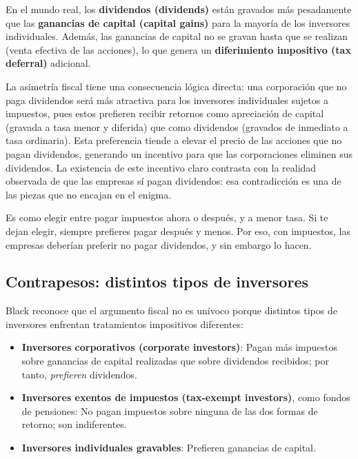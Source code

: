 \documentclass[12pt]{article}
\begin{document}
En el mundo real, los \textbf{dividendos (dividends)} est\'an gravados m\'as pesadamente que las \textbf{ganancias de capital (capital gains)} para la mayor\'ia de los inversores individuales. Adem\'as, las ganancias de capital no se gravan hasta que se realizan (venta efectiva de las acciones), lo que genera un \textbf{diferimiento impositivo (tax deferral)} adicional.

\begin{explicacion}
La asimetr\'ia fiscal tiene una consecuencia l\'ogica directa: una corporaci\'on que no paga dividendos ser\'a m\'as atractiva para los inversores individuales sujetos a impuestos, pues estos prefieren recibir retornos como apreciaci\'on de capital (gravada a tasa menor y diferida) que como dividendos (gravados de inmediato a tasa ordinaria). Esta preferencia tiende a elevar el precio de las acciones que no pagan dividendos, generando un incentivo para que las corporaciones eliminen sus dividendos. La existencia de este incentivo claro contrasta con la realidad observada de que las empresas s\'i pagan dividendos: esa contradicci\'on es una de las piezas que no encajan en el enigma.
\end{explicacion}

\begin{intuicion}
Es como elegir entre pagar impuestos ahora o despu\'es, y a menor tasa. Si te dejan elegir, siempre prefieres pagar despu\'es y menos. Por eso, con impuestos, las empresas deber\'ian preferir no pagar dividendos, y sin embargo lo hacen.
\end{intuicion}

\subsection{Contrapesos: distintos tipos de inversores}

Black reconoce que el argumento fiscal no es un\'ivoco porque distintos tipos de inversores enfrentan tratamientos impositivos diferentes:

\begin{itemize}
  \item \textbf{Inversores corporativos (corporate investors)}: Pagan m\'as impuestos sobre ganancias de capital realizadas que sobre dividendos recibidos; por tanto, \textit{prefieren} dividendos.
  \item \textbf{Inversores exentos de impuestos (tax-exempt investors)}, como fondos de pensiones: No pagan impuestos sobre ninguna de las dos formas de retorno; son indiferentes.
  \item \textbf{Inversores individuales gravables}: Prefieren ganancias de capital.
\end{itemize}
\end{document}

